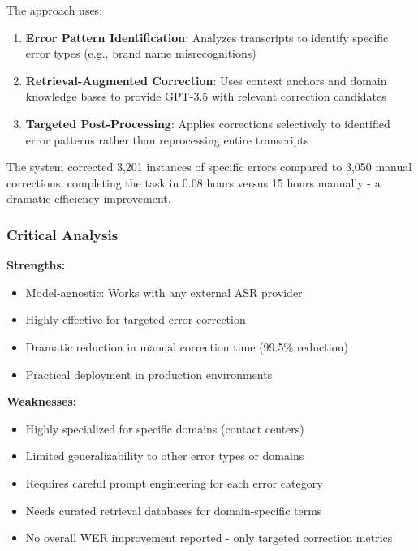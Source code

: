 The approach uses:

\begin{enumerate}[topsep=6pt,itemsep=3pt]
    \item \textbf{Error Pattern Identification}: Analyzes transcripts to identify specific error types (e.g., brand name misrecognitions)
    \item \textbf{Retrieval-Augmented Correction}: Uses context anchors and domain knowledge bases to provide GPT-3.5 with relevant correction candidates
    \item \textbf{Targeted Post-Processing}: Applies corrections selectively to identified error patterns rather than reprocessing entire transcripts
\end{enumerate}

The system corrected 3,201 instances of specific errors compared to 3,050 manual corrections, completing the task in 0.08 hours versus 15 hours manually - a dramatic efficiency improvement.

\subsubsection{Critical Analysis}

\textbf{Strengths:}
\begin{itemize}[topsep=4pt,itemsep=2pt]
    \item Model-agnostic: Works with any external ASR provider
    \item Highly effective for targeted error correction
    \item Dramatic reduction in manual correction time (99.5\% reduction)
    \item Practical deployment in production environments
\end{itemize}

\textbf{Weaknesses:}
\begin{itemize}[topsep=4pt,itemsep=2pt]
    \item Highly specialized for specific domains (contact centers)
    \item Limited generalizability to other error types or domains
    \item Requires careful prompt engineering for each error category
    \item Needs curated retrieval databases for domain-specific terms
    \item No overall WER improvement reported - only targeted correction metrics
\end{itemize}

